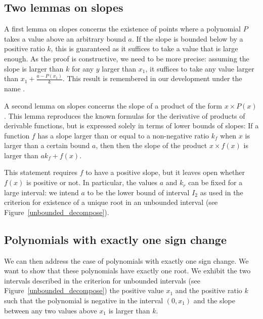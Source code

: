 \documentclass{mscs}
\begin{document}
\subsection{Two lemmas on slopes}
A first lemma on slopes concerns the existence of points where a
polynomial \(P\) takes a value above an arbitrary bound \(a\).  If the slope
is bounded below by a positive ratio \(k\), this is guaranteed as it
suffices to take a value that is large enough.  As the proof is
constructive, we need to be more precise: assuming the slope is larger
than \(k\) for any \(y\) larger than \(x_1\), it suffices to take any
value larger than \(x_1 + \frac{a - P(x_1)}{k}\).  This result is
remembered in our development under the name .

A second lemma on slopes concerns the slope of a product of the form
\(x \times P(x)\).  This
lemma reproduces the known formulas for the derivative of products of derivable
functions, but is expressed solely in terms of lower bounds of slopes:
 If  a function \(f\) has a slope larger than or equal to a non-negative
ratio \(k_f\) when \(x\) is larger than a certain bound \(a\), then
then the slope of the product \(x \times f(x)\) is larger than
\(a k_f + f(x)\).

This statement requires \(f\) to have a positive slope, but it leaves open
whether \(f(x)\) is positive or not.  In particular, the values \(a\) and
\(k_r\) can be fixed for a large interval: we intend \(a\) to be the lower
bound of interval \(I_2\) as used in the criterion for existence of a unique
root in an unbounded interval (see Figure~\ref{unbounded_decompose}).

\subsection{Polynomials with exactly one sign change}
We can then address the case of polynomials with exactly one sign
change.  We want
to show that these polynomials have exactly one root.  We exhibit the
two intervals described in the criterion for unbounded intervals (see
Figure~\ref{unbounded_decompose}) the positive value \(x_1\) and the
positive ratio \(k\) such that the polynomial is negative in the
interval \((0, x_1)\) and the slope between any two values above
\(x_1\) is larger than \(k\).
\end{document}
